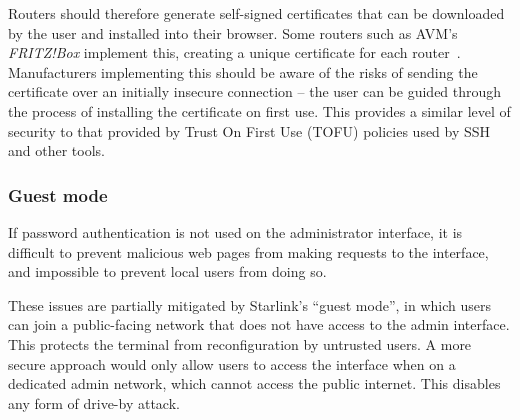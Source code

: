Routers should therefore generate self-signed certificates that can be downloaded by the user and installed into their browser.
Some routers such as AVM's \textit{FRITZ!Box} implement this, creating a unique certificate for each router~\cite{fritzbox_cert}.
Manufacturers implementing this should be aware of the risks of sending the certificate over an initially insecure connection -- the user can be guided through the process of installing the certificate on first use.
This provides a similar level of security to that provided by Trust On First Use (TOFU) policies used by SSH and other tools.

\subsubsection{Guest mode}

If password authentication is not used on the administrator interface, it is difficult to prevent malicious web pages from making requests to the interface, and impossible to prevent local users from doing so.

These issues are partially mitigated by Starlink's ``guest mode'', in which users can join a public-facing network that does not have access to the admin interface.
This protects the terminal from reconfiguration by untrusted users.
A more secure approach would only allow users to access the interface when on a dedicated admin network, which cannot access the public internet.
This disables any form of drive-by attack.
